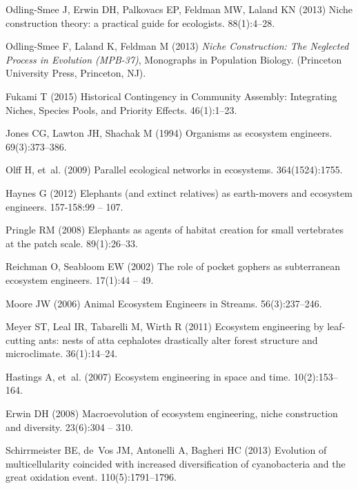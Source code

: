 \documentclass[twocolumn,preprintnumbers,amsmath,amssymb,superscriptaddress]{revtex4}
\begin{document}
\begin{thebibliography}{10}
Odling-Smee J, Erwin DH, Palkovacs EP, Feldman MW, Laland KN (2013) {Niche
  construction theory: a practical guide for ecologists.}
 88(1):4--28.

Odling-Smee F, Laland K, Feldman M (2013) {\em Niche Construction: The
  Neglected Process in Evolution (MPB-37)}, Monographs in Population Biology.
\newblock (Princeton University Press, Princeton, NJ).

Fukami T (2015) {Historical Contingency in Community Assembly: Integrating
  Niches, Species Pools, and Priority Effects}.
 46(1):1--23.

Jones CG, Lawton JH, Shachak M (1994) Organisms as ecosystem engineers.
 69(3):373--386.

Olff H, et~al. (2009) {Parallel ecological networks in ecosystems}.
 364(1524):1755.

Haynes G (2012) Elephants (and extinct relatives) as earth-movers and ecosystem
  engineers.
 157-158:99 -- 107.

Pringle RM (2008) Elephants as agents of habitat creation for small vertebrates
  at the patch scale.
 89(1):26--33.

Reichman O, Seabloom EW (2002) The role of pocket gophers as subterranean
  ecosystem engineers.
 17(1):44 -- 49.

Moore JW (2006) {Animal Ecosystem Engineers in Streams}.
 56(3):237--246.

Meyer ST, Leal IR, Tabarelli M, Wirth R (2011) Ecosystem engineering by
  leaf-cutting ants: nests of atta cephalotes drastically alter forest
  structure and microclimate.
 36(1):14--24.

Hastings A, et~al. (2007) {Ecosystem engineering in space and time}.
 10(2):153--164.

Erwin DH (2008) Macroevolution of ecosystem engineering, niche construction and
  diversity.
 23(6):304 -- 310.

Schirrmeister BE, de~Vos JM, Antonelli A, Bagheri HC (2013) Evolution of
  multicellularity coincided with increased diversification of cyanobacteria
  and the great oxidation event.
 110(5):1791--1796.


\end{thebibliography}
\end{document}
